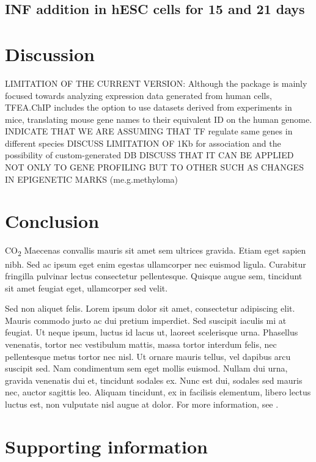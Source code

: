 \documentclass[10pt,letterpaper]{article}
\begin{document}
	\subsection{INF addition in hESC cells for 15 and 21 days}
	
	\section*{Discussion}
	LIMITATION OF THE CURRENT VERSION: Although the package is mainly focused towards analyzing expression data generated from human cells, TFEA.ChIP includes the option to use datasets derived from experiments in mice, translating mouse gene names to their equivalent ID on the human genome. INDICATE THAT WE ARE ASSUMING THAT TF regulate same genes in different species
	DISCUSS LIMITATION OF 1Kb for association and the possibility of custom-generated DB
	DISCUSS THAT IT CAN BE APPLIED NOT ONLY TO GENE PROFILING BUT TO OTHER SUCH AS CHANGES IN EPIGENETIC MARKS (me.g.methyloma)
	\section*{Conclusion}
	
	CO\textsubscript{2} Maecenas convallis mauris sit amet sem ultrices gravida. Etiam eget sapien nibh. Sed ac ipsum eget enim egestas ullamcorper nec euismod ligula. Curabitur fringilla pulvinar lectus consectetur pellentesque. Quisque augue sem, tincidunt sit amet feugiat eget, ullamcorper sed velit. 
	
	Sed non aliquet felis. Lorem ipsum dolor sit amet, consectetur adipiscing elit. Mauris commodo justo ac dui pretium imperdiet. Sed suscipit iaculis mi at feugiat. Ut neque ipsum, luctus id lacus ut, laoreet scelerisque urna. Phasellus venenatis, tortor nec vestibulum mattis, massa tortor interdum felis, nec pellentesque metus tortor nec nisl. Ut ornare mauris tellus, vel dapibus arcu suscipit sed. Nam condimentum sem eget mollis euismod. Nullam dui urna, gravida venenatis dui et, tincidunt sodales ex. Nunc est dui, sodales sed mauris nec, auctor sagittis leo. Aliquam tincidunt, ex in facilisis elementum, libero lectus luctus est, non vulputate nisl augue at dolor. For more information, see .
	
	\section*{Supporting information}
	
\end{document}
